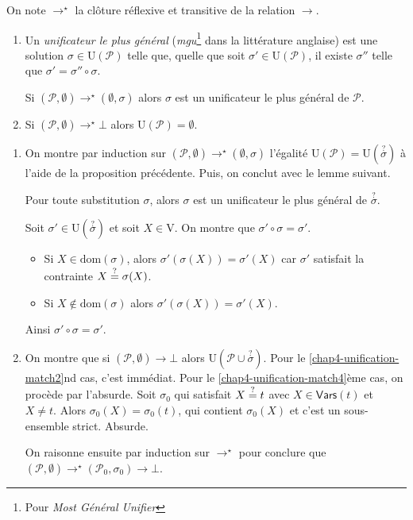 \documentclass[../main]{subfiles}
\begin{document}
  \begin{prop}
    On note $\to^\star$ la clôture réflexive et transitive de la relation $\to$.
    \begin{enumerate}
      \item Un \textit{unificateur le plus général} (\textit{mgu}\footnote{Pour \textit{Most Général Unifier}} dans la littérature anglaise) est une solution $\sigma \in \mathrm{U}(\mathcal{P})$ telle que, quelle que soit $\sigma' \in \mathrm{U}(\mathcal{P})$, il existe $\sigma''$ telle que $\sigma' = \sigma'' \circ \sigma$.

        Si $(\mathcal{P}, \emptyset) \to^\star (\emptyset, \sigma)$ alors $\sigma$ est un unificateur le plus général de $\mathcal{P}$.
      \item Si $(\mathcal{P}, \emptyset) \to^\star \bot$ alors $\mathrm{U}(\mathcal{P}) = \emptyset$.
    \end{enumerate}
  \end{prop}
  \begin{prv}
    \begin{enumerate}
      \item On montre par induction sur $(\mathcal{P}, \emptyset) \to^\star (\emptyset, \sigma)$ l'égalité $\mathrm{U}(\mathcal{P}) = \mathrm{U}(\overset ? \sigma)$ à l'aide de la proposition précédente.
        Puis, on conclut avec le lemme suivant.
    \begin{lem}
      Pour toute substitution $\sigma$, alors $\sigma$ est un unificateur le plus général de $\overset ? \sigma$.
    \end{lem}
    \begin{prv}
      Soit $\sigma' \in \mathrm{U}(\overset ? \sigma)$ et soit $X \in \mathrm{V}$. On montre que $\sigma' \circ \sigma = \sigma'$.
       \begin{itemize}
        \item Si $X \in \mathrm{dom}(\sigma)$, alors $\sigma'(\sigma(X)) = \sigma'(X)$ car  $\sigma'$ satisfait la contrainte  $X \mathrel{\overset ? =} \sigma(X)$.
        \item Si  $X \not\in  \mathrm{dom}(\sigma)$ alors $\sigma'(\sigma(X)) = \sigma'(X)$.
      \end{itemize}
      Ainsi $\sigma' \circ \sigma = \sigma'$.
    \end{prv}
      \item On montre que si $(\mathcal{P}, \emptyset) \to \bot$ alors $\mathrm{U}(\mathcal{P} \cup \overset ? \sigma)$.
        Pour le \ref{chap4-unification-match2}nd cas, c'est immédiat.
        Pour le \ref{chap4-unification-match4}ème cas, on procède par l'absurde.
        Soit $\sigma_0$ qui satisfait $X \mathrel{\overset ? =} t$ avec $X \in \mathsf{Vars}(t)$ et~$X \neq t$.
        Alors $\sigma_0(X) = \sigma_0(t)$, qui contient $\sigma_0(X)$ et c'est un sous-ensemble strict. Absurde.

        On raisonne ensuite par induction sur $\to^\star$ pour conclure que $(\mathcal{P}, \emptyset) \to^\star (\mathcal{P}_0, \sigma_0) \to \bot$.
    \end{enumerate}
  \end{prv}
\end{document}
